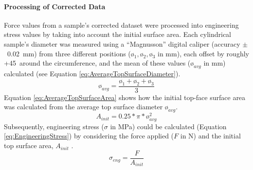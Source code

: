 \paragraph{Processing of Corrected Data}
Force values from a sample's corrected dataset were processed into
 engineering stress values by taking into account the initial surface area.
Each cylindrical sample's diameter was measured using a ``Magnusson''
 digital caliper (accuracy \(\pm\)~0.02~\unit{\milli\metre}) from three
 different positions (\(\text{ø}_{1},\text{ø}_{2},\text{ø}_{3}\)
 in \unit{\milli\metre}), each offset by roughly +45\degree~around the
 circumference, and the mean of these values (\(\text{ø}_{avg}\) in
 \unit{\milli\metre}) calculated (see Equation
 \ref{eq:AverageTopSurfaceDiameter}).
\begin{equation}\label{eq:AverageTopSurfaceDiameter}
    \text{ø}_{avg} = \frac{\text{ø}_{1}+\text{ø}_{2}+\text{ø}_{3}}{3}
\end{equation}
Equation \ref{eq:AverageTopSurfaceArea} shows how the initial top-face
 surface area was calculated from the average top surface diameter
 \(\text{ø}_{avg}\).
 \begin{equation}\label{eq:AverageTopSurfaceArea}
    A_{init} = 0.25 * \pi * \text{ø}_{avg}^{2}
\end{equation}
Subsequently, engineering stress (\(\sigma\) in \unit{\mega\pascal}) could
 be calculated (Equation \ref{eq:EngineeringStress}) by considering the
 force applied (\(F\) in \unit{\newton}) and the initial top surface area,
 \(A_{init}\) \cite{Martin2006}.
\begin{equation}\label{eq:EngineeringStress}
    \sigma _{eng} =\frac{F}{A_{init}}
\end{equation}

